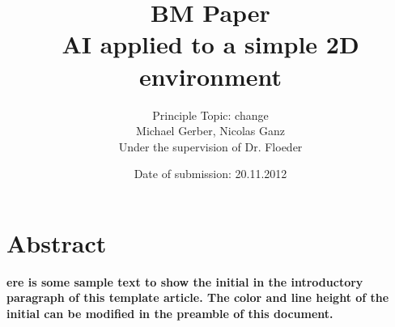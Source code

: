 %
%
%
%




\usepackage{glossaries} %
\makeglossaries





\begin{titlepage}
  \thispagestyle{empty}

  \title{
    BM Paper\bigskip\\
    \fontsize{20}{20}
    \selectfont
    AI applied to a simple 2D environment
  }
  \author{
    Principle Topic: change\bigskip\\
    Michael Gerber, Nicolas Ganz\\
    Under the supervision of Dr. Floeder
  }
  \date{Date of submission: 20.11.2012}
  \maketitle %
\end{titlepage}

\tableofcontents

\chapter{Abstract}
\textbf{ere is some sample text to show the initial in the introductory paragraph of this template article. The color and line height of the initial can be modified in the preamble of this document.}


